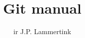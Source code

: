 \newcommand*{\BOOKCLASS}{}


\title{Git manual}
\author{ir J.P. Lammertink}
\maketitle
\tableofcontents

\printbibliography[heading=bibintoc]


